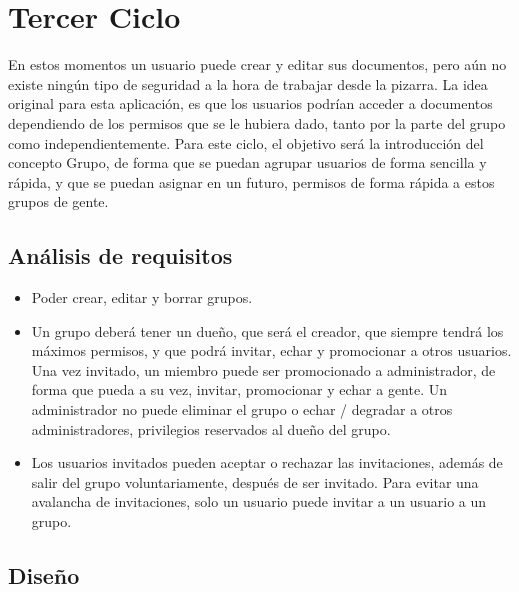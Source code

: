 \section{Tercer Ciclo} %
\label{sec:tercer_ciclo}

En estos momentos un usuario puede crear y editar sus documentos, pero aún no existe ningún tipo de seguridad a la hora de trabajar desde la pizarra. La idea original para esta aplicación, es que los usuarios podrían acceder a documentos dependiendo de los permisos que se le hubiera dado, tanto por la parte del grupo como independientemente. Para este ciclo, el objetivo será la introducción del concepto Grupo, de forma que se puedan agrupar usuarios de forma sencilla y rápida, y que se puedan asignar en un futuro, permisos de forma rápida a estos grupos de gente.

\subsection{Análisis de requisitos} %
\label{sub:análisis_de_requisitos}

\begin{itemize}
  \item Poder crear, editar y borrar grupos.
  \item Un grupo deberá tener un dueño, que será el creador, que siempre tendrá los máximos permisos, y que podrá invitar, echar y promocionar a otros usuarios. Una vez invitado, un miembro puede ser promocionado a administrador, de forma que pueda a su vez, invitar, promocionar y echar a gente. Un administrador no puede eliminar el grupo o echar / degradar a otros administradores, privilegios reservados al dueño del grupo.
  \item Los usuarios invitados pueden aceptar o rechazar las invitaciones, además de salir del grupo voluntariamente, después de ser invitado. Para evitar una avalancha de invitaciones, solo un usuario puede invitar a un usuario a un grupo.
\end{itemize}


\subsection{Diseño} %
\label{sub:diseño}

